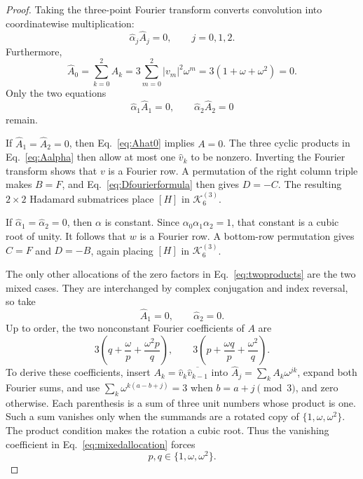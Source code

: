 \documentclass[aps,prx,reprint,nofootinbib,twoside,superscriptaddress,longbibliography,floatfix]{revtex4-2}
\theoremstyle{definition}
\newcommand{\KK}{\mathcal K}
\begin{document}
\begin{proof}
Taking the three-point Fourier transform converts convolution into coordinatewise multiplication:
\begin{equation}
\widehat\alpha_j\widehat A_j=0,\qquad j=0,1,2.
\label{eq:fourierproduct}
\end{equation}
Furthermore,
\begin{equation}
\widehat A_0=\sum_{k=0}^{2}A_k
=3\sum_{m=0}^{2}|v_m|^2\omega^m
=3(1+\omega+\omega^2)=0.
\label{eq:Ahat0}
\end{equation}
Only the two equations
\begin{equation}
\widehat\alpha_1\widehat A_1=0,
\qquad
\widehat\alpha_2\widehat A_2=0
\label{eq:twoproducts}
\end{equation}
remain.

If $\widehat A_1=\widehat A_2=0$, then Eq.~\eqref{eq:Ahat0} implies $A=0$. The three cyclic products in Eq.~\eqref{eq:Aalpha} then allow at most one $\widehat v_k$ to be nonzero.  Inverting the Fourier transform shows that $v$ is a Fourier row.  A permutation of the right column triple makes $B=F$, and Eq.~\eqref{eq:Dfourierformula} then gives $D=-C$.  The resulting $2\times2$ Hadamard submatrices place $[H]$ in $\KK_6^{(3)}$.

If $\widehat\alpha_1=\widehat\alpha_2=0$, then $\alpha$ is constant.  Since $\alpha_0\alpha_1\alpha_2=1$, that constant is a cubic root of unity.  It follows that $w$ is a Fourier row.  A bottom-row permutation gives $C=F$ and $D=-B$, again placing $[H]$ in $\KK_6^{(3)}$.

The only other allocations of the zero factors in Eq.~\eqref{eq:twoproducts} are the two mixed cases.  They are interchanged by complex conjugation and index reversal, so take
\begin{equation}
\widehat A_1=0,\qquad \widehat\alpha_2=0.
\label{eq:mixedallocation}
\end{equation}
Up to order, the two nonconstant Fourier coefficients of $A$ are
\begin{equation}
3\left(q+\frac{\omega}{p}+\frac{\omega^2p}{q}\right),
\qquad
3\left(p+\frac{\omega q}{p}+\frac{\omega^2}{q}\right).
\label{eq:AhatExplicit}
\end{equation}
To derive these coefficients, insert $A_k=\widehat v_k\overline{\widehat v_{k-1}}$ into $\widehat A_j=\sum_kA_k\omega^{jk}$, expand both Fourier sums, and use $\sum_k\omega^{k(a-b+j)}=3$ when $b=a+j\pmod3$, and zero otherwise. Each parenthesis is a sum of three unit numbers whose product is one. Such a sum vanishes only when the summands are a rotated copy of $\{1,\omega,\omega^2\}$. The product condition makes the rotation a cubic root.  Thus the vanishing coefficient in Eq.~\eqref{eq:mixedallocation} forces
\begin{equation}
p,q\in\{1,\omega,\omega^2\}.
\label{eq:pqcubic}
\end{equation}


\end{proof}
\end{document}

